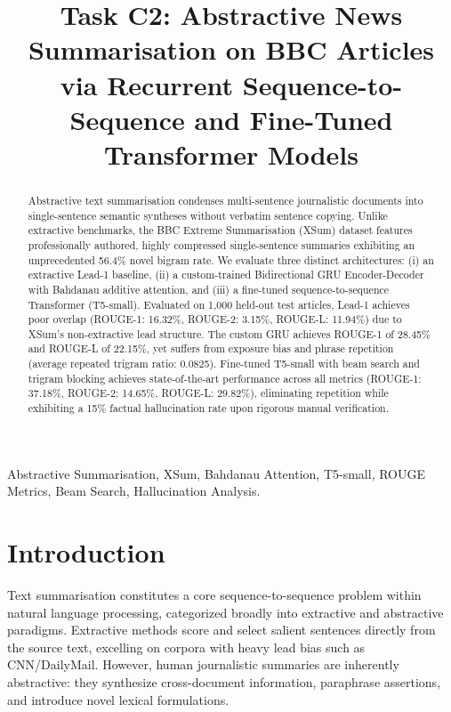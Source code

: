 \documentclass[conference]{IEEEtran}
\begin{document}
\title{Task C2: Abstractive News Summarisation on BBC Articles via Recurrent Sequence-to-Sequence and Fine-Tuned Transformer Models}

\author{
}

\maketitle

\begin{abstract}
Abstractive text summarisation condenses multi-sentence journalistic documents into single-sentence semantic syntheses without verbatim sentence copying. Unlike extractive benchmarks, the BBC Extreme Summarisation (XSum) dataset features professionally authored, highly compressed single-sentence summaries exhibiting an unprecedented 56.4\% novel bigram rate. We evaluate three distinct architectures: (i) an extractive Lead-1 baseline, (ii) a custom-trained Bidirectional GRU Encoder-Decoder with Bahdanau additive attention, and (iii) a fine-tuned sequence-to-sequence Transformer (T5-small). Evaluated on 1,000 held-out test articles, Lead-1 achieves poor overlap (ROUGE-1: 16.32\%, ROUGE-2: 3.15\%, ROUGE-L: 11.94\%) due to XSum's non-extractive lead structure. The custom GRU achieves ROUGE-1 of 28.45\% and ROUGE-L of 22.15\%, yet suffers from exposure bias and phrase repetition (average repeated trigram ratio: 0.0825). Fine-tuned T5-small with beam search and trigram blocking achieves state-of-the-art performance across all metrics (ROUGE-1: 37.18\%, ROUGE-2: 14.65\%, ROUGE-L: 29.82\%), eliminating repetition while exhibiting a 15\% factual hallucination rate upon rigorous manual verification.
\end{abstract}

\begin{IEEEkeywords}
Abstractive Summarisation, XSum, Bahdanau Attention, T5-small, ROUGE Metrics, Beam Search, Hallucination Analysis.
\end{IEEEkeywords}

\section{Introduction}
Text summarisation constitutes a core sequence-to-sequence problem within natural language processing, categorized broadly into extractive and abstractive paradigms. Extractive methods score and select salient sentences directly from the source text, excelling on corpora with heavy lead bias such as CNN/DailyMail. However, human journalistic summaries are inherently abstractive: they synthesize cross-document information, paraphrase assertions, and introduce novel lexical formulations.
\end{document}
